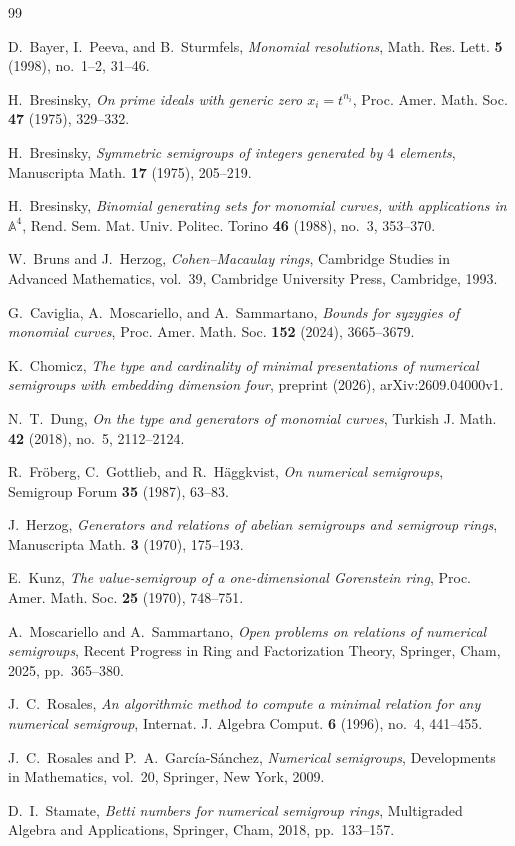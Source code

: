 \documentclass{amsart}
\theoremstyle{definition}
\theoremstyle{remark}
\numberwithin{equation}{section}
\begin{document}
\begin{thebibliography}{99}

D.~Bayer, I.~Peeva, and B.~Sturmfels, \emph{Monomial resolutions}, Math. Res. Lett. \textbf{5} (1998), no.~1--2, 31--46.

H.~Bresinsky, \emph{On prime ideals with generic zero $x_i=t^{n_i}$}, Proc. Amer. Math. Soc. \textbf{47} (1975), 329--332.

H.~Bresinsky, \emph{Symmetric semigroups of integers generated by $4$ elements}, Manuscripta Math. \textbf{17} (1975), 205--219.

H.~Bresinsky, \emph{Binomial generating sets for monomial curves, with applications in $\mathbb{A}^4$}, Rend. Sem. Mat. Univ. Politec. Torino \textbf{46} (1988), no.~3, 353--370.

W.~Bruns and J.~Herzog, \emph{Cohen--Macaulay rings}, Cambridge Studies in Advanced Mathematics, vol.~39, Cambridge University Press, Cambridge, 1993.

G.~Caviglia, A.~Moscariello, and A.~Sammartano, \emph{Bounds for syzygies of monomial curves}, Proc. Amer. Math. Soc. \textbf{152} (2024), 3665--3679.

K.~Chomicz, \emph{The type and cardinality of minimal presentations of numerical semigroups with embedding dimension four}, preprint (2026), arXiv:2609.04000v1.

N.~T.~Dung, \emph{On the type and generators of monomial curves}, Turkish J. Math. \textbf{42} (2018), no.~5, 2112--2124.

R.~Fr\"oberg, C.~Gottlieb, and R.~H\"aggkvist, \emph{On numerical semigroups}, Semigroup Forum \textbf{35} (1987), 63--83.

J.~Herzog, \emph{Generators and relations of abelian semigroups and semigroup rings}, Manuscripta Math. \textbf{3} (1970), 175--193.

E.~Kunz, \emph{The value-semigroup of a one-dimensional Gorenstein ring}, Proc. Amer. Math. Soc. \textbf{25} (1970), 748--751.

A.~Moscariello and A.~Sammartano, \emph{Open problems on relations of numerical semigroups}, Recent Progress in Ring and Factorization Theory, Springer, Cham, 2025, pp.~365--380.

J.~C.~Rosales, \emph{An algorithmic method to compute a minimal relation for any numerical semigroup}, Internat. J. Algebra Comput. \textbf{6} (1996), no.~4, 441--455.

J.~C.~Rosales and P.~A.~Garc\'ia-S\'anchez, \emph{Numerical semigroups}, Developments in Mathematics, vol.~20, Springer, New York, 2009.

D.~I.~Stamate, \emph{Betti numbers for numerical semigroup rings}, Multigraded Algebra and Applications, Springer, Cham, 2018, pp.~133--157.

\end{thebibliography}
\end{document}
